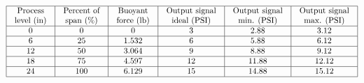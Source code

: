 






$$\vbox{\offinterlineskip
\halign{\strut
\vrule \quad\hfil # \ \hfil & 
\vrule \quad\hfil # \ \hfil & 
\vrule \quad\hfil # \ \hfil & 
\vrule \quad\hfil # \ \hfil & 
\vrule \quad\hfil # \ \hfil & 
\vrule \quad\hfil # \ \hfil \vrule \cr
\noalign{\hrule}
%
Process & Percent of & Buoyant & Output signal & Output signal & Output signal \cr
%
level (in) & span (\%) & force (lb) & ideal (PSI) & min. (PSI) & max. (PSI) \cr
%
\noalign{\hrule}
%
0  & 0 & 0 & 3 & 2.88 & 3.12 \cr
%
\noalign{\hrule}
%
6 & 25 & 1.532 & 6 & 5.88 & 6.12 \cr
%
\noalign{\hrule}
%
12 & 50 & 3.064 & 9 & 8.88 & 9.12 \cr
%
\noalign{\hrule}
%
18 & 75 & 4.597 & 12 & 11.88 & 12.12 \cr
%
\noalign{\hrule}
%
24 & 100 & 6.129 & 15 & 14.88 & 15.12 \cr
%
\noalign{\hrule}
} %
}$$ %












